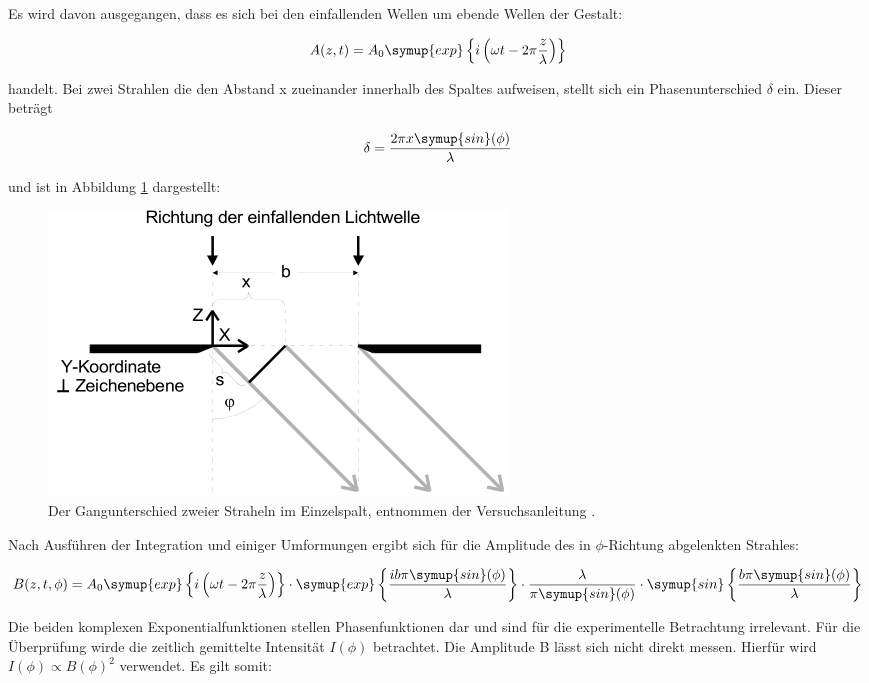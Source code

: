 Es wird davon ausgegangen, dass es sich bei den einfallenden Wellen um ebende Wellen der Gestalt:

\begin{equation}
  A(z,t) = A_0 \symup{exp}\left\{i \left(\omega t - 2\pi \frac{z}{\lambda} \right) \right\}
\end{equation}

handelt.
Bei zwei Strahlen die den Abstand x zueinander innerhalb des Spaltes aufweisen, stellt sich ein Phasenunterschied $\delta$ ein.
Dieser beträgt

\begin{equation}
  \delta = \frac{2\pi x \symup{sin}(\phi)}{\lambda}
\end{equation}

und ist in Abbildung \ref{fig:Phasenunterschied} dargestellt:

\begin{figure}
  \centering
  \includegraphics[scale=0.7]{images/Phasenunterschied.png}
  \caption{Der Gangunterschied zweier Straheln im Einzelspalt, entnommen der Versuchsanleitung \cite[32]{1}.}
  \label{fig:Phasenunterschied}
\end{figure}

Nach Ausführen der Integration und einiger Umformungen ergibt sich für die Amplitude des in $\phi$-Richtung abgelenkten Strahles:

\begin{equation}
  B(z, t, \phi) = A_0 \symup{exp}\left\{i \left(\omega t - 2\pi \frac{z}{\lambda} \right) \right\}
  \cdot \symup{exp}\left\{ \frac{i b \pi \symup{sin}(\phi)}{\lambda} \right\}
  \cdot \frac{\lambda}{\pi \symup{sin}(\phi)}
  \cdot \symup{sin} \left\{ \frac{b \pi \symup{sin}(\phi)}{\lambda} \right\}
\end{equation}

Die beiden komplexen Exponentialfunktionen stellen Phasenfunktionen dar und sind für die experimentelle Betrachtung irrelevant.
Für die Überprüfung wirde die zeitlich gemittelte Intensität $I(\phi)$ betrachtet.
Die Amplitude B lässt sich nicht direkt messen.
Hierfür wird $I(\phi) \propto B(\phi)^2$ verwendet.
Es gilt somit:

